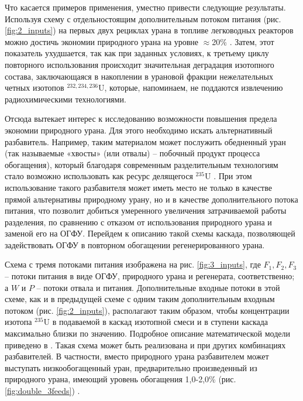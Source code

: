 
Что касается примеров применения, уместно привести следующие результаты. Используя схему с отдельностоящим дополнительным потоком питания (рис. \ref{fig:2_inputs}) на первых двух рециклах урана в топливе легководных реакторов можно достичь экономии природного урана на уровне $\approx$20\% \cite{smirnovApplyingEnrichmentCapacities2018}. Затем, этот показатель ухудшается, так как при заданных условиях, к третьему циклу повторного использования происходит значительная деградация изотопного состава, заключающаяся в накоплении в урановой фракции нежелательных четных изотопов $^{232,234,236}$U, которые, напоминаем, не поддаются извлечению радиохимическими технологиями.

Отсюда вытекает интерес к исследованию возможности повышения предела экономии природного урана. Для этого необходимо искать альтернативный разбавитель. Например, таким материалом может послужить обедненный уран (так называемые «хвосты» (или отвалы) -- побочный продукт процесса обогащения), который благодаря современным разделительным технологиям стало возможно использовать как ресурс делящегося $^{235}$U \cite{oecdManagementDepletedUranium2001, ITOGIDEYaTELNOSTIGOSUDARSTVENNOY}. При этом использование такого разбавителя может иметь место не только в качестве прямой альтернативы природному урану, но и в качестве дополнительного потока питания, что позволит добиться умеренного увеличения затрачиваемой работы разделения, по сравнению с отказом от использования природного урана и заменой его на ОГФУ. Перейдем к описанию такой схемы каскада, позволяющей задействовать ОГФУ в повторном обогащении регенерированного урана.

Схема с тремя потоками питания изображена на рис. \ref{fig:3_inputs}, где $F_{1}, F_{2}, F_{3}$ -- потоки питания в виде ОГФУ, природного урана и регенерата, соответственно; а $W$ и $P$ -- потоки отвала и питания. Дополнительные входные потоки в этой схеме, как и в предыдущей схеме с одним таким дополнительным входным потоком (рис. \ref{fig:2_inputs}), располагают таким образом, чтобы концентрации изотопа $^{235}$U в подаваемой в каскад изотопной смеси и в ступени каскада максимально близки по значению. Подробное описание математической модели приведено в \cite{smirnovEnrichmentRegeneratedUranium2014}. Такая схема может быть реализована и при других комбинациях разбавителей. В частности, вместо природного урана разбавителем может выступать низкообогащенный уран, предварительно произведенный из природного урана, имеющий уровень обогащения 1,0-2,0\% (рис. \ref{fig:double_3feeds}) \cite{smirnovDilutionRecycledUranium2015}. 

